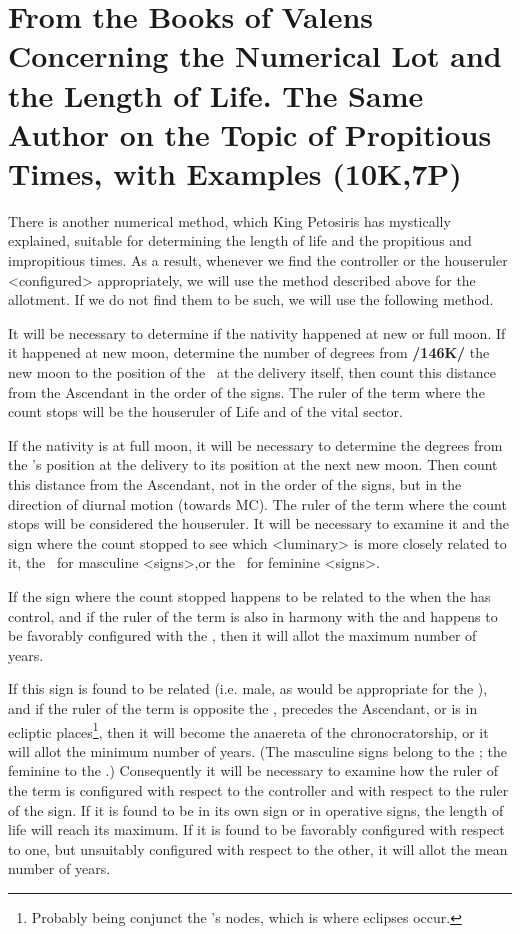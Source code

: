 \section{From the Books of Valens Concerning the Numerical Lot and the Length of Life. The Same Author on the Topic of Propitious Times, with Examples (10K,7P)}
There is another numerical method, which  King Petosiris has mystically explained, suitable for determining the length of life and the propitious and impropitious times. As a result, whenever we find the controller or the houseruler <configured> appropriately, we will use the method described above for the allotment. If we do not find them to be such, we will use the following method.

It will be necessary to determine if the nativity happened at new or full moon. If it happened at new moon, determine the number of degrees from \textbf{/146K/} the new moon to the position of the \Moon\, at the delivery itself, then count this distance from the Ascendant in the order of the signs. The ruler of the term where the count stops will be the houseruler of Life and of the vital sector. 

If the nativity is at full moon, it will be necessary to determine the degrees from the \Moon’s position at the delivery to its position at the next new moon. Then count this distance from the Ascendant, not in the order of the signs, but in the direction of diurnal motion (towards MC). The ruler of the term where the count stops will be considered the houseruler. It will be necessary to examine it and the sign where the count stopped to see which <luminary> is more closely related to it, the \Sun\, for masculine <signs>,or the \Moon\, for feminine <signs>.

If the sign where the count stopped happens to be related to the \Sun\xspace when the \Sun\xspace has control, and if the
ruler of the term is also in harmony with the \Sun\xspace and happens to be favorably configured with the \Sun, then
it will allot the maximum number of years. 

If this sign is found to be related (i.e. male, as would be appropriate for the \Sun), and if the ruler of the term is opposite the \Sun, precedes the Ascendant, or is in ecliptic places\footnote{Probably being conjunct the \Moon's nodes, which is where eclipses occur.}, then it will become the anaereta of the chronocratorship, or it will allot the minimum number of years. (The masculine signs belong to the \Sun; the feminine to the \Moon.) Consequently it will be necessary to examine how the ruler of the term is configured with respect to the controller and with respect to the ruler of the sign. If it is found to be in its own sign or in operative signs, the length of life will reach its maximum. If it is found to be favorably configured with respect to one, but unsuitably configured with respect to the other, it will allot the mean number of years. 

